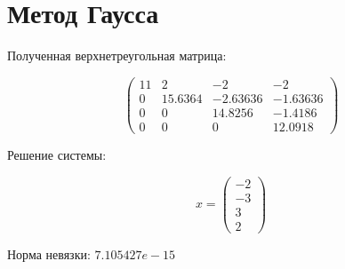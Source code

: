 \section*{Метод Гаусса}

Полученная верхнетреугольная матрица:

\[
\begin{pmatrix}
11 & 2 & -2 & -2 \\
0 & 15.6364 & -2.63636 & -1.63636 \\
0 & 0 & 14.8256 & -1.4186 \\
0 & 0 & 0 & 12.0918
\end{pmatrix}
\]

Решение системы:

\[
x = \begin{pmatrix}
-2 \\
-3 \\
3 \\
2
\end{pmatrix}
\]

Норма невязки: $7.105427e-15$
